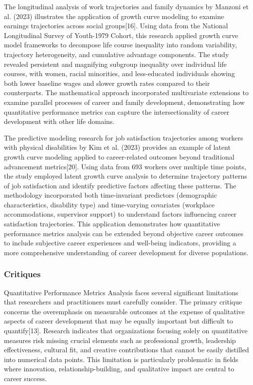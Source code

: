 \documentclass[main.tex]{subfiles}
\begin{document}
The longitudinal analysis of work trajectories and family dynamics by Manzoni et al. (2023) illustrates the application of growth curve modeling to examine earnings trajectories across social groups[16]. Using data from the National Longitudinal Survey of Youth-1979 Cohort, this research applied growth curve model frameworks to decompose life course inequality into random variability, trajectory heterogeneity, and cumulative advantage components. The study revealed persistent and magnifying subgroup inequality over individual life courses, with women, racial minorities, and less-educated individuals showing both lower baseline wages and slower growth rates compared to their counterparts. The mathematical approach incorporated multivariate extensions to examine parallel processes of career and family development, demonstrating how quantitative performance metrics can capture the intersectionality of career development with other life domains.

The predictive modeling research for job satisfaction trajectories among workers with physical disabilities by Kim et al. (2023) provides an example of latent growth curve modeling applied to career-related outcomes beyond traditional advancement metrics[20]. Using data from 693 workers over multiple time points, the study employed latent growth curve analysis to determine trajectory patterns of job satisfaction and identify predictive factors affecting these patterns. The methodology incorporated both time-invariant predictors (demographic characteristics, disability type) and time-varying covariates (workplace accommodations, supervisor support) to understand factors influencing career satisfaction trajectories. This application demonstrates how quantitative performance metrics analysis can be extended beyond objective career outcomes to include subjective career experiences and well-being indicators, providing a more comprehensive understanding of career development for diverse populations.

\subsubsection{Critiques}

Quantitative Performance Metrics Analysis faces several significant limitations that researchers and practitioners must carefully consider. The primary critique concerns the overemphasis on measurable outcomes at the expense of qualitative aspects of career development that may be equally important but difficult to quantify[13]. Research indicates that organizations focusing solely on quantitative measures risk missing crucial elements such as professional growth, leadership effectiveness, cultural fit, and creative contributions that cannot be easily distilled into numerical data points. This limitation is particularly problematic in fields where innovation, relationship-building, and qualitative impact are central to career success.
\end{document}
